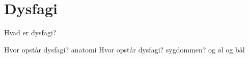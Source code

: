 \chapter{Dysfagi}

Hvad er dysfagi?

Hvor opstår dysfagi? anatomi 
Hvor opstår dysfagi? sygdommen?\citep{Nahrstaedt2012SwallowMeasurements}
og øl og bål
\cite{Sand2008MennesketsFysiologi}



